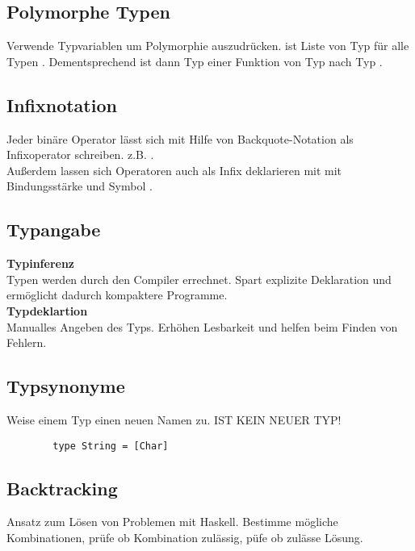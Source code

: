 \subsection{Polymorphe Typen}%
\label{hsk:sub:polymorphe-typen}
Verwende Typvariablen um Polymorphie auszudrücken.
\code{[t]} ist Liste von Typ  für alle Typen .
Dementsprechend ist dann  Typ einer Funktion von Typ  nach Typ .
        
\subsection{Infixnotation}%
\label{hsk:sub:infixnotation}
Jeder binäre Operator lässt sich mit Hilfe von Backquote-Notation als Infixoperator schreiben.
z.B. .\\
Außerdem lassen sich Operatoren auch als Infix deklarieren mit  mit Bindungsstärke  und Symbol .

\subsection{Typangabe}%
\label{hsk:sub:typangabe}
\textbf{Typinferenz}\\
Typen werden durch den Compiler errechnet. Spart explizite Deklaration und ermöglicht dadurch kompaktere Programme.\\
\textbf{Typdeklartion}\\
Manualles Angeben des Typs. Erhöhen Lesbarkeit und helfen beim Finden von Fehlern.

\subsection{Typsynonyme}%
\label{hsk:sub:typsynonyme}
Weise einem Typ einen neuen Namen zu. IST KEIN NEUER TYP!
\begin{lstlisting}
        type String = [Char]
\end{lstlisting}

\subsection{Backtracking}%
\label{hsk:sub:backtracking}
Ansatz zum Lösen von Problemen mit Haskell.
Bestimme mögliche Kombinationen, prüfe ob Kombination zulässig, püfe ob zulässe Lösung.

